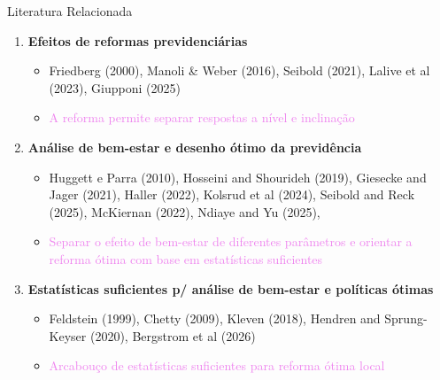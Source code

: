 \begin{frame}[label=literature]{Literatura Relacionada}
\begin{enumerate}
    \item \textbf{Efeitos de reformas previdenciárias}
    \vspace{0.3em}

    \begin{itemize}
        \item Friedberg (2000), Manoli \& Weber (2016), Seibold (2021), Lalive et al (2023),  Giupponi (2025)
        \vspace{0.3em}
        \item[\textcolor{violet}{$\rightarrow$}] \textcolor{violet}{A reforma permite separar respostas a nível e inclinação}
        
    \end{itemize}
    
    \vspace{0.3em}
    
    \item \textbf{Análise de bem-estar e desenho ótimo da previdência}
    \vspace{0.3em}
    
    \begin{itemize}
         \item Huggett e Parra (2010), Hosseini and Shourideh (2019), Giesecke and Jager (2021), Haller (2022), Kolsrud et al (2024), Seibold and Reck (2025), McKiernan (2022), Ndiaye and Yu (2025), 
        \item[\textcolor{violet}{$\rightarrow$}] \textcolor{violet}{Separar o efeito de bem-estar de diferentes parâmetros e orientar a reforma ótima com base em estatísticas suficientes}
    \end{itemize}
    \item \textbf{Estatísticas suficientes p/ análise de bem-estar e políticas ótimas}
    \vspace{0.3em}
    \begin{itemize}
        \item Feldstein (1999), Chetty (2009), Kleven (2018), Hendren and Sprung-Keyser (2020), Bergstrom et al (2026)
        \item[\textcolor{violet}{$\rightarrow$}] \textcolor{violet}{Arcabouço de estatísticas suficientes para reforma ótima local}
    \end{itemize}
\end{enumerate}
\end{frame}

